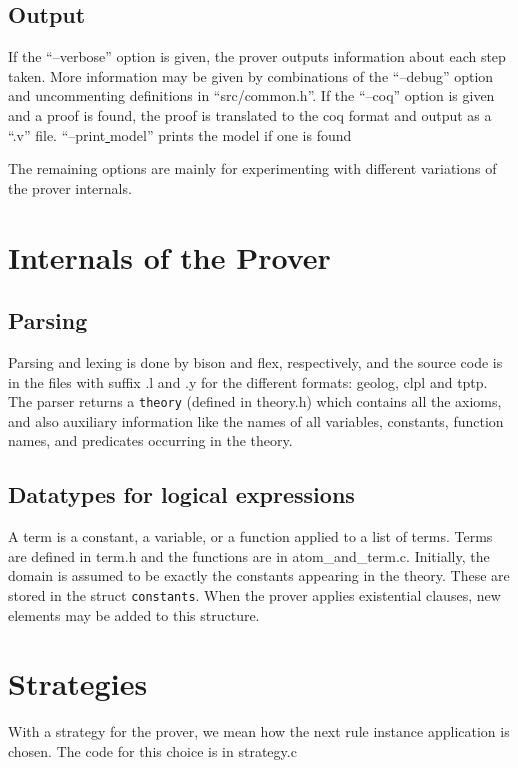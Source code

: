 \documentclass[a4paper]{article}
\begin{document}
\subsection{Output}
If the ``--verbose'' option is given, the prover outputs information about each step taken. More information may be given by combinations of the ``--debug'' option and uncommenting definitions in ``src/common.h''. 
If the ``--coq'' option is given and a proof is found, the proof is translated to the coq format and output as a ``.v'' file. ``--print\underline{ }model'' prints the model if one is found

The remaining options are mainly for experimenting with different variations of the prover internals. 
\section{Internals of the Prover}

\subsection{Parsing}
Parsing and lexing is done by bison and flex, respectively, and the source code is in the files with suffix .l and .y for the different formats: geolog, clpl and tptp. The parser returns a \verb|theory| (defined in theory.h) which contains all the axioms, and also auxiliary information like the names of all variables, constants, function names, and predicates occurring in the theory. 

\subsection{Datatypes for logical expressions}
A term is a constant, a variable, or a function applied to a list of terms. Terms are defined in term.h and the functions are in atom_and_term.c. Initially, the domain is assumed to be exactly the constants appearing in the theory. These are stored in the struct \verb|constants|. When the prover applies existential clauses, new elements may be added to this structure. 

\section{Strategies}
With a strategy for the prover, we mean how the next rule instance application is chosen. The code for this choice is in strategy.c
\end{document}
